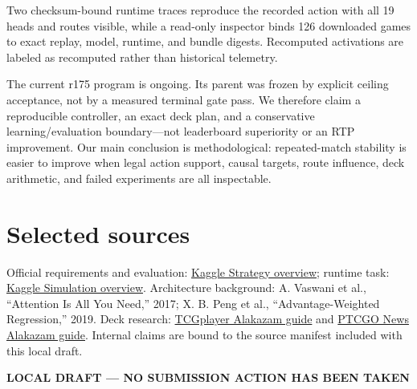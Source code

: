 \documentclass[10pt]{article}
\begin{document}
Two checksum-bound runtime traces reproduce the recorded action with all 19 heads and routes visible, while a read-only inspector binds 126 downloaded games to exact replay, model, runtime, and bundle digests. Recomputed activations are labeled as recomputed rather than historical telemetry.

The current r175 program is ongoing. Its parent was frozen by explicit ceiling acceptance, not by a measured terminal gate pass. We therefore claim a reproducible controller, an exact deck plan, and a conservative learning/evaluation boundary---not leaderboard superiority or an RTP improvement. Our main conclusion is methodological: repeated-match stability is easier to improve when legal action support, causal targets, route influence, deck arithmetic, and failed experiments are all inspectable.

\section*{Selected sources}

\small
Official requirements and evaluation: \href{https://www.kaggle.com/competitions/pokemon-tcg-ai-battle-challenge-strategy/overview}{Kaggle Strategy overview}; runtime task: \href{https://www.kaggle.com/competitions/pokemon-tcg-ai-battle/overview/description}{Kaggle Simulation overview}. Architecture background: A. Vaswani et al., ``Attention Is All You Need,'' 2017; X. B. Peng et al., ``Advantage-Weighted Regression,'' 2019. Deck research: \href{https://www.tcgplayer.com/content/article/Alakazam-Deck-Guide-Pok%C3%A9mon-TCG/7eb46b82-9dc5-40d8-adf9-28cca05f070f/}{TCGplayer Alakazam guide} and \href{https://ptcgonews.com/tips/ptcgl-alakazam-deck-guide/}{PTCGO News Alakazam guide}. Internal claims are bound to the source manifest included with this local draft.

\vfill
\begin{center}
\color{red}\textbf{LOCAL DRAFT --- NO SUBMISSION ACTION HAS BEEN TAKEN}
\end{center}
\end{document}
